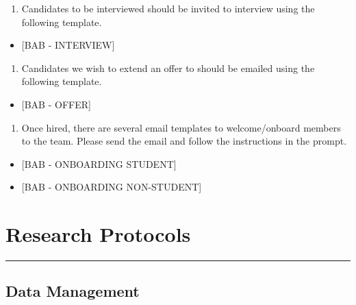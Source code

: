 \documentclass[]{book}
\providecommand{\tightlist}{%
  \setlength{\itemsep}{0pt}\setlength{\parskip}{0pt}}
\begin{document}
\begin{enumerate}
\def\labelenumi{\arabic{enumi}.}
\setcounter{enumi}{1}
\tightlist
\item
  Candidates to be interviewed should be invited to interview using the following template.
\end{enumerate}

\begin{itemize}
\tightlist
\item
  {[}BAB - INTERVIEW{]}
\end{itemize}

\begin{enumerate}
\def\labelenumi{\arabic{enumi}.}
\setcounter{enumi}{2}
\tightlist
\item
  Candidates we wish to extend an offer to should be emailed using the following template.
\end{enumerate}

\begin{itemize}
\tightlist
\item
  {[}BAB - OFFER{]}
\end{itemize}

\begin{enumerate}
\def\labelenumi{\arabic{enumi}.}
\setcounter{enumi}{3}
\tightlist
\item
  Once hired, there are several email templates to welcome/onboard members to the team. Please send the email and follow the instructions in the prompt.
\end{enumerate}

\begin{itemize}
\tightlist
\item
  {[}BAB - ONBOARDING STUDENT{]}
\item
  {[}BAB - ONBOARDING NON-STUDENT{]}
\end{itemize}

\hypertarget{research-protocols}{%
\chapter{Research Protocols}\label{research-protocols}}

\begin{center}\rule{0.5\linewidth}{\linethickness}\end{center}

\hypertarget{data-management}{%
\section{Data Management}\label{data-management}}
\end{document}
